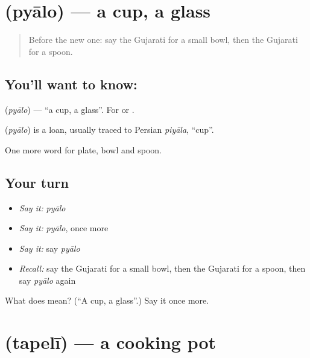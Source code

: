 \section[\texorpdfstring{\gu{પ્યાલો} (pyālo)}{પ્યાલો (pyālo)}]{ (pyālo) — a cup, a glass}

\label{lesson:GU-C61-cup}



\begin{quote}
Before the new one: say the Gujarati for a small bowl, then the Gujarati for a spoon.
\end{quote}

\subsection*{You'll want to know: }
\textbf{} (\emph{pyālo}) — \textquotedblleft{}a cup, a glass\textquotedblright{}. For \textbf{} or \textbf{}.

\begin{cousinweb}
\textbf{} (\emph{pyālo}) is a loan, usually traced to Persian \emph{piyāla}, \textquotedblleft{}cup\textquotedblright{}.
\end{cousinweb}

\begin{grammarlens}[title={What you've built}]
One more word for plate, bowl and spoon.
\end{grammarlens}

\subsection*{Your turn}
\begin{itemize}
\raggedright
  \item \emph{Say it:} \emph{pyālo}
  \item \emph{Say it:} \emph{pyālo}, once more
  \item \emph{Say it:} say \emph{pyālo}
  \item \emph{Recall:} say the Gujarati for a small bowl, then the Gujarati for a spoon, then say \emph{pyālo} again
\end{itemize}

\begin{tcolorbox}[breakable,colback=teal!4,colframe=teal!35!black,title={Before you move on}]
What does  mean? (\textquotedblleft{}A cup, a glass\textquotedblright{}.) Say it once more.
\end{tcolorbox}
\section[\texorpdfstring{\gu{તપેલી} (tapelī)}{તપેલી (tapelī)}]{ (tapelī) — a cooking pot}

